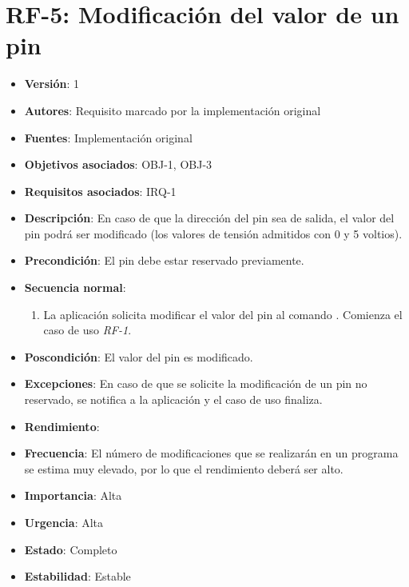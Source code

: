 \documentclass[letterpaper,10pt,spanish]{sphinxmanual}
\begin{document}
\section{RF-5: Modificación del valor de un pin}
\label{analysis/fr:rf-5-modificacion-del-valor-de-un-pin}\begin{itemize}
\item {} 
\textbf{Versión}: 1

\item {} 
\textbf{Autores}: Requisito marcado por la implementación original

\item {} 
\textbf{Fuentes}: Implementación original

\item {} 
\textbf{Objetivos asociados}: OBJ-1, OBJ-3

\item {} 
\textbf{Requisitos asociados}: IRQ-1

\item {} 
\textbf{Descripción}: En caso de que la dirección del pin sea de salida, el valor del pin podrá ser modificado (los valores de tensión admitidos con 0 y 5 voltios).

\item {} 
\textbf{Precondición}: El pin debe estar reservado previamente.

\item {} 
\textbf{Secuencia normal}:
\begin{enumerate}
\item {} 
La aplicación solicita modificar el valor del pin al comando . Comienza el caso de uso \emph{RF-1}.

\end{enumerate}

\item {} 
\textbf{Poscondición}: El valor del pin es modificado.

\item {} 
\textbf{Excepciones}: En caso de que se solicite la modificación de un pin no reservado, se notifica a la aplicación y el caso de uso finaliza.

\item {} 
\textbf{Rendimiento}:

\item {} 
\textbf{Frecuencia}: El número de modificaciones que se realizarán en un programa se estima muy elevado, por lo que el rendimiento deberá ser alto.

\item {} 
\textbf{Importancia}: Alta

\item {} 
\textbf{Urgencia}: Alta

\item {} 
\textbf{Estado}: Completo

\item {} 
\textbf{Estabilidad}: Estable

\end{itemize}
\end{document}
